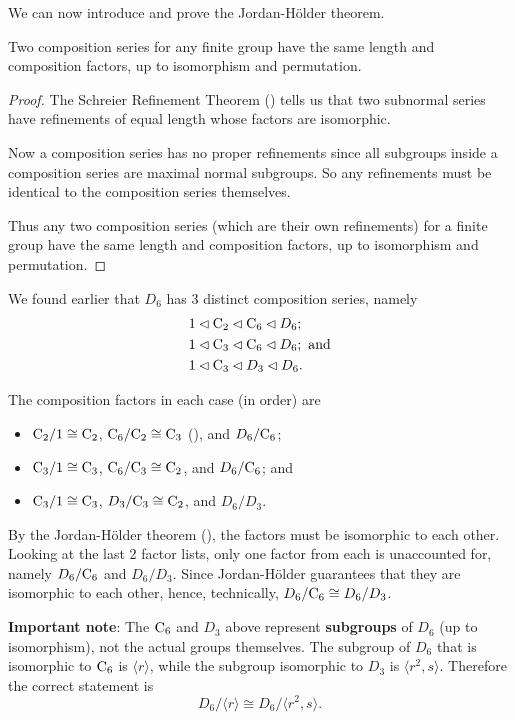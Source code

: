 We can now introduce and prove the Jordan-H\"older theorem.

\begin{theorem}\label{thrm-jordan-holder}
    Two composition series for any finite group have the same length and composition factors, up to isomorphism and permutation.
\end{theorem}
\begin{proof}
    The Schreier Refinement Theorem () tells us that two subnormal series have refinements of equal length whose factors are isomorphic.

    Now a composition series has no proper refinements since all subgroups inside a composition series are maximal normal subgroups. So any refinements must be identical to the composition series themselves.

    Thus any two composition series (which are their own refinements) for a finite group have the same length and composition factors, up to isomorphism and permutation.
\end{proof}

\begin{example}
    We found earlier that $D_6$ has 3 distinct composition series, namely
    \begin{align*}
        &1 \lhd \mathrm{C}_{2} \lhd \mathrm{C}_{6} \lhd D_6;\\
        &1 \lhd \mathrm{C}_{3} \lhd \mathrm{C}_{6} \lhd D_6; \text{ and}\\
        &1 \lhd \mathrm{C}_{3} \lhd D_3 \lhd D_6.
    \end{align*}

    \newpage

    The composition factors in each case (in order) are
    \begin{itemize}
        \item $\mathrm{C}_{2}/1 \cong \mathrm{C}_{2}$, $\mathrm{C}_{6}/\mathrm{C}_{2} \cong \mathrm{C}_{3}$ (), and $D_6 / \mathrm{C}_{6}$;
        \item $\mathrm{C}_{3}/1 \cong \mathrm{C}_{3}$, $\mathrm{C}_{6}/\mathrm{C}_{3} \cong \mathrm{C}_{2}$, and $D_6 / \mathrm{C}_{6}$; and
        \item $\mathrm{C}_{3}/1 \cong \mathrm{C}_{3}$, $D_3 / \mathrm{C}_{3} \cong \mathrm{C}_{2}$, and $D_6 / D_3$.
    \end{itemize}
    By the Jordan-H\"older theorem (), the factors must be isomorphic to each other. Looking at the last 2 factor lists, only one factor from each is unaccounted for, namely $D_6 / \mathrm{C}_{6}$ and $D_6 / D_3$. Since Jordan-H\"older guarantees that they are isomorphic to each other, hence, technically, $D_6 / \mathrm{C}_{6} \cong D_6 / D_3$.

    \textbf{Important note}: The $\mathrm{C}_{6}$ and $D_3$ above represent \textbf{subgroups} of $D_6$ (up to isomorphism), not the actual groups themselves. The subgroup of $D_6$ that is isomorphic to $\mathrm{C}_{6}$ is $\langle r \rangle$, while the subgroup isomorphic to $D_3$ is $\langle r^2, s\rangle$. Therefore the correct statement is
    \[
        D_6 / \langle r \rangle \cong D_6 / \langle r^2, s\rangle.
    \]
\end{example}

